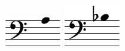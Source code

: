 \includegraphics{12_altura_dis-ad-ar-asc-d_difere_corrigido-1}%
\ifx\betweenLilyPondSystem \undefined
  \linebreak
\else
  \expandafter{}%
\fi
\includegraphics{12_altura_dis-ad-ar-asc-d_difere_corrigido-2}%

